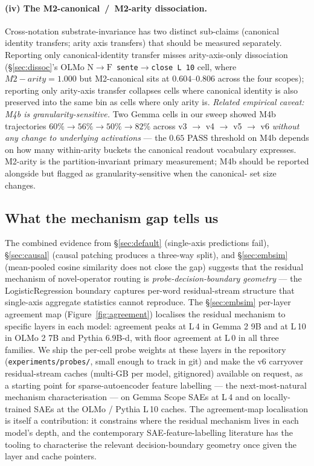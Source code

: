 \documentclass[11pt,letterpaper]{article}
\newcommand{\NtoF}{\ensuremath{\mathrm{N}\!\to\!\mathrm{F}}}
\newcommand{\Mc}{M2-canonical}
\newcommand{\Ma}{M2-arity}
\newcommand{\Mbfb}{M4b}
\begin{document}
\paragraph{(iv) The \Mc{}~/~\Ma{} dissociation.} Cross-notation
substrate-invariance has two distinct sub-claims (canonical identity
transfers; arity axis transfers) that should be measured separately.
Reporting only canonical-identity transfer misses arity-axis-only
dissociation (\S\ref{sec:dissoc}'s OLMo
\texttt{\NtoF{} sente$\to$close L\,10} cell, where $\Ma = 1.000$ but
\Mc{} sits at $0.604$--$0.806$ across the four scopes); reporting
only arity-axis transfer collapses cells where canonical identity is
also preserved into the same bin as cells where only arity is.
\emph{Related empirical caveat: \Mbfb{} is granularity-sensitive.}
Two Gemma cells in our sweep showed \Mbfb{} trajectories
$60\% \to 56\% \to 50\% \to 82\%$ across v3 $\to$ v4 $\to$ v5 $\to$
v6 \emph{without any change to underlying activations} --- the
$0.65$ PASS threshold on \Mbfb{} depends on how many within-arity
buckets the canonical readout vocabulary expresses. \Ma{} is the
partition-invariant primary measurement; \Mbfb{} should be reported
alongside but flagged as granularity-sensitive when the canonical-
set size changes.

\subsection{What the mechanism gap tells us}
\label{sec:mech}

The combined evidence from \S\ref{sec:default} (single-axis
predictions fail), \S\ref{sec:causal} (causal patching produces a
three-way split), and \S\ref{sec:embsim} (mean-pooled cosine
similarity does not close the gap) suggests that the residual
mechanism of novel-operator routing is \emph{probe-decision-boundary
geometry} --- the LogisticRegression boundary captures per-word
residual-stream structure that single-axis aggregate statistics
cannot reproduce. The \S\ref{sec:embsim} per-layer agreement map
(Figure~\ref{fig:agreement}) localises the residual mechanism to
specific layers in each model: agreement peaks at L\,4 in
Gemma 2 9B and at L\,10 in OLMo 2 7B and Pythia 6.9B-d, with floor
agreement at L\,0 in all three families. We ship the per-cell probe
weights at these layers in the repository
(\texttt{experiments/probes/}, small enough to track in git) and
make the v6 carryover residual-stream caches (multi-GB per model,
gitignored) available on request, as a starting point for
sparse-autoencoder feature labelling --- the next-most-natural
mechanism characterisation --- on Gemma Scope SAEs at L\,4 and on
locally-trained SAEs at the OLMo / Pythia L\,10 caches. The
agreement-map localisation is itself a contribution: it constrains
where the residual mechanism lives in each model's depth, and the
contemporary SAE-feature-labelling literature has the tooling to
characterise the relevant decision-boundary geometry once given the
layer and cache pointers.
\end{document}
